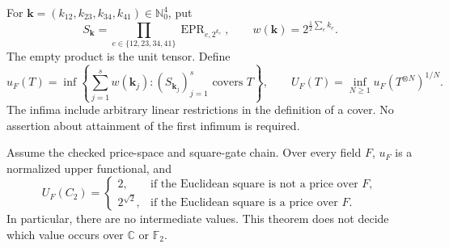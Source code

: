 For $\mathbf k=(k_{12},k_{23},k_{34},k_{41})\in\mathbb N_0^4$,
put
\[
 S_{\mathbf k}=\prod_{e\in\{12,23,34,41\}}
 \operatorname{EPR}_{e,2^{k_e}},\qquad
 w(\mathbf k)=2^{\frac12\sum_e k_e}.
\]
The empty product is the unit tensor. Define
\[
 u_F(T)=\inf\left\{\sum_{j=1}^s w(\mathbf k_j):
           (S_{\mathbf k_j})_{j=1}^s\text{ covers }T\right\},
 \qquad
 U_F(T)=\inf_{N\geq1}u_F(T^{\otimes N})^{1/N}.
 \tag{PG-CYCLE-cover}
\]
The infima include arbitrary linear restrictions in the definition
of a cover. No assertion about attainment of the first infimum is
required.

\begin{theorem}
\label{pg:cycle-gap}
Assume the checked price-space and square-gate chain. Over every
field $F$, $u_F$ is a normalized upper functional, and
\[
 U_F(C_2)=
 \begin{cases}
 2,&\text{if the Euclidean square is not a price over }F,\\
 2^{\sqrt2},&\text{if the Euclidean square is a price over }F.
 \end{cases}
 \tag{PG-CYCLE-two-values}
\]
In particular, there are no intermediate values. This theorem does
not decide which value occurs over $\mathbb C$ or $\mathbb F_2$.
\end{theorem}
